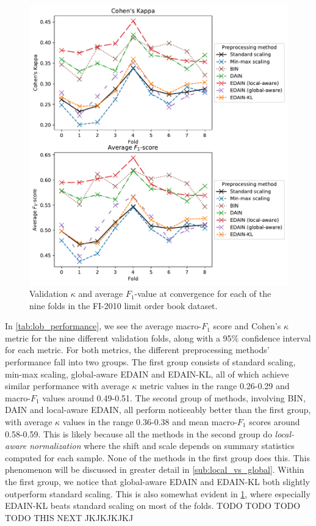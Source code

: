 \documentclass{statsmsc}
\begin{document}
{%
\begin{figure}[htp]
\begin{center}
    \includegraphics[width=\textwidth]{figures/lob_performance_per_fold.pdf}
\end{center}
\caption{Validation $\kappa$ and average $F_1$-value at convergence for each of the
    nine folds in the FI-2010 limit order book dataset.}
\label{fig:lob_folds}
\end{figure}

In \cref{tab:lob_performance}, we see the average macro-$F_1$ score and Cohen's $\kappa$ metric
for the nine different validation folds, along with a 95\% confidence interval for each metric.
For both metrics, the different preprocessing methods' performance fall into two groups.
The first group consists of standard scaling, min-max scaling, global-aware \ac{EDAIN} and
\ac{EDAIN-KL}, all of which achieve similar performance with average $\kappa$ metric values
in the range 0.26-0.29 and macro-$F_1$ values around 0.49-0.51. The second group of methods,
involving \ac{BIN}, \ac{DAIN} and local-aware \ac{EDAIN}, all perform noticeably better than the
first group, with average $\kappa$ values in the range 0.36-0.38 and mean macro-$F_1$ scores around
0.58-0.59. This is likely because all the methods in the second group do
\textit{local-aware normalization} where the shift and scale depends on summary statistics computed
for each sample. None of the methods in the first group does this. This phenomenon will be
discussed in greater detail in \cref{sub:local_vs_global}.
Within the first group, we notice that global-aware \ac{EDAIN} and \ac{EDAIN-KL} both slightly
outperform standard scaling. This is also somewhat evident in \cref{fig:lob_folds}, where
especially \ac{EDAIN-KL} beats standard scaling on most of the folds.
TODO TODO TODO TODO THIS NEXT JKJKJKJKJ

}
\end{document}
